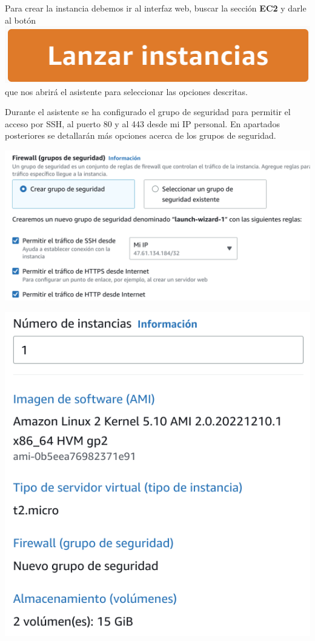 \documentclass{\ClassPath/viu-tfm-template}
\begin{document}
Para crear la instancia debemos ir al interfaz web, buscar la sección \textbf{EC2} y darle al botón \includegraphics[width=0.2\linewidth]{img/boton.png} que nos abrirá el asistente para seleccionar las opciones descritas.

Durante el asistente se ha configurado el grupo de seguridad para permitir el acceso por SSH, al puerto 80 y al 443 desde mi IP personal. En apartados posteriores se detallarán más opciones acerca de los grupos de seguridad.

{
\begin{minipage}{0.6\linewidth}
    \includegraphics[frame,width=\linewidth]{img/seguridad.png}
\end{minipage}
\hfill
\begin{minipage}{0.35\linewidth}
    \includegraphics[frame,width=\linewidth]{img/resumen.png}
\end{minipage}
}
\end{document}
